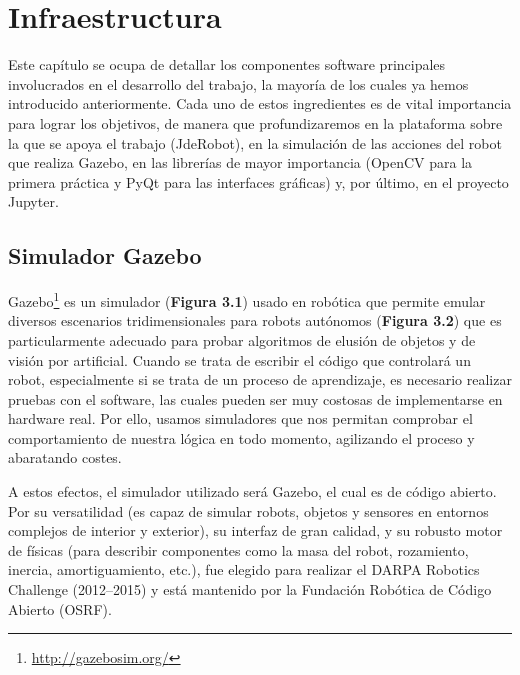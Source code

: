 \chapter{Infraestructura}\label{cap.infraestructura}
Este capítulo se ocupa de detallar  los componentes software principales involucrados en el desarrollo del trabajo, la mayoría de los cuales ya hemos introducido anteriormente. Cada uno de estos ingredientes es de vital importancia para lograr los objetivos, de manera que profundizaremos en la plataforma sobre la que se apoya el trabajo (JdeRobot), en la simulación de las acciones del robot que realiza Gazebo, en las librerías de mayor importancia (OpenCV para la primera práctica y PyQt para las interfaces gráficas) y, por último, en el proyecto Jupyter.

\section{Simulador Gazebo}
Gazebo\footnote{\url{http://gazebosim.org/}} es un simulador (\textbf{Figura 3.1}) usado en robótica que permite emular diversos escenarios tridimensionales para robots autónomos (\textbf{Figura 3.2}) que es particularmente adecuado para probar algoritmos de elusión de objetos y de visión por artificial. Cuando se trata de escribir el código que controlará un robot, especialmente si se trata de un proceso de aprendizaje, es necesario realizar pruebas con el software, las cuales pueden ser muy costosas de implementarse en hardware real. Por ello, usamos simuladores que nos permitan comprobar el comportamiento de nuestra lógica en todo momento, agilizando el proceso y abaratando costes. 

A estos efectos, el simulador utilizado será Gazebo, el cual es de código abierto. Por su versatilidad (es capaz de simular robots, objetos y sensores en entornos complejos de interior y exterior), su interfaz de gran calidad, y su robusto motor de físicas (para describir componentes como la masa del robot, rozamiento, inercia, amortiguamiento, etc.), fue elegido para realizar el DARPA Robotics Challenge (2012–2015) y está mantenido por la Fundación Robótica de Código Abierto (OSRF).

